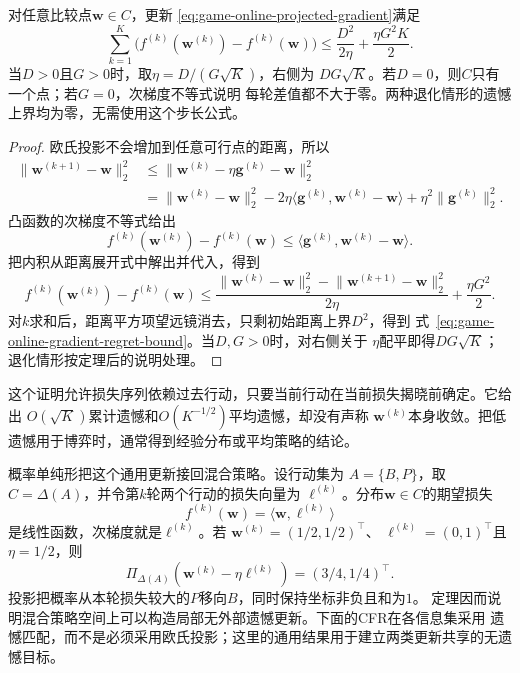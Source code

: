 \begin{theorem}[在线投影次梯度的外部遗憾]
\label{thm:game-online-gradient-regret}
对任意比较点\(\bm{w}\in C\)，更新
\eqref{eq:game-online-projected-gradient}满足
\begin{equation}
  \sum_{k=1}^{K}
  \bigl(
    f^{(k)}(\bm{w}^{(k)})-f^{(k)}(\bm{w})
  \bigr)
  \leq
  \frac{D^2}{2\eta}
  +\frac{\eta G^2K}{2}.
  \label{eq:game-online-gradient-regret-bound}
\end{equation}
当\(D>0\)且\(G>0\)时，取\(\eta=D/(G\sqrt{K})\)，右侧为
\(DG\sqrt{K}\)。若\(D=0\)，则\(C\)只有一个点；若\(G=0\)，次梯度不等式说明
每轮差值都不大于零。两种退化情形的遗憾上界均为零，无需使用这个步长公式。
\end{theorem}

\begin{proof}
欧氏投影不会增加到任意可行点的距离，所以
\begin{align*}
  \lVert\bm{w}^{(k+1)}-\bm{w}\rVert_2^2
  &\leq
  \lVert
    \bm{w}^{(k)}-\eta\bm{g}^{(k)}-\bm{w}
  \rVert_2^2\\
  &=
  \lVert\bm{w}^{(k)}-\bm{w}\rVert_2^2
  -2\eta
  \langle
    \bm{g}^{(k)},\bm{w}^{(k)}-\bm{w}
  \rangle
  +\eta^2\lVert\bm{g}^{(k)}\rVert_2^2.
\end{align*}
凸函数的次梯度不等式给出
\[
  f^{(k)}(\bm{w}^{(k)})-f^{(k)}(\bm{w})
  \leq
  \langle
    \bm{g}^{(k)},\bm{w}^{(k)}-\bm{w}
  \rangle.
\]
把内积从距离展开式中解出并代入，得到
\[
  f^{(k)}(\bm{w}^{(k)})-f^{(k)}(\bm{w})
  \leq
  \frac{
    \lVert\bm{w}^{(k)}-\bm{w}\rVert_2^2
    -
    \lVert\bm{w}^{(k+1)}-\bm{w}\rVert_2^2
  }{2\eta}
  +\frac{\eta G^2}{2}.
\]
对\(k\)求和后，距离平方项望远镜消去，只剩初始距离上界\(D^2\)，得到
式~\eqref{eq:game-online-gradient-regret-bound}。当\(D,G>0\)时，对右侧关于
\(\eta\)配平即得\(DG\sqrt{K}\)；退化情形按定理后的说明处理。
\end{proof}

这个证明允许损失序列依赖过去行动，只要当前行动在当前损失揭晓前确定。它给出
\(O(\sqrt{K})\)累计遗憾和\(O(K^{-1/2})\)平均遗憾，却没有声称
\(\bm{w}^{(k)}\)本身收敛。把低遗憾用于博弈时，通常得到经验分布或平均策略的结论。

概率单纯形把这个通用更新接回混合策略。设行动集为
\(A=\{B,P\}\)，取\(C=\Delta(A)\)，并令第\(k\)轮两个行动的损失向量为
\(\bm{\ell}^{(k)}\)。分布\(\bm{w}\in C\)的期望损失
\[
  f^{(k)}(\bm{w})
  =
  \langle\bm{w},\bm{\ell}^{(k)}\rangle
\]
是线性函数，次梯度就是\(\bm{\ell}^{(k)}\)。若
\(\bm{w}^{(k)}=(1/2,1/2)^{\top}\)、
\(\bm{\ell}^{(k)}=(0,1)^{\top}\)且\(\eta=1/2\)，则
\[
  \Pi_{\Delta(A)}
  \left(
    \bm{w}^{(k)}-\eta\bm{\ell}^{(k)}
  \right)
  =
  (3/4,1/4)^{\top}.
\]
投影把概率从本轮损失较大的\(P\)移向\(B\)，同时保持坐标非负且和为\(1\)。
定理因而说明混合策略空间上可以构造局部无外部遗憾更新。下面的CFR在各信息集采用
遗憾匹配，而不是必须采用欧氏投影；这里的通用结果用于建立两类更新共享的无遗憾目标。

